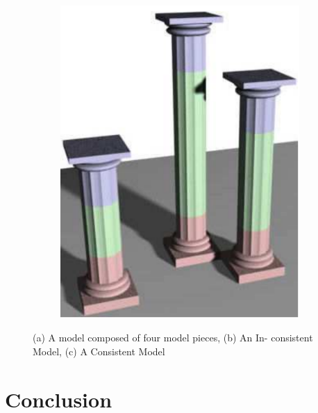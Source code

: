 \documentclass[b5paper,twoside,11pt]{article}
\begin{document}
\begin{figure}
\begin{subfigure}[b]{0.3\textwidth}
		\includegraphics[width=\textwidth]{1c}
		\caption{}
		\label{fig:1c}
	\end{subfigure}
	\caption{ (a) A model composed of four model pieces, (b) An In-
		consistent Model, (c) A Consistent Model}\label{fig:animals}
\end{figure}


\newpage
\section{Conclusion}

 

\end{document}
